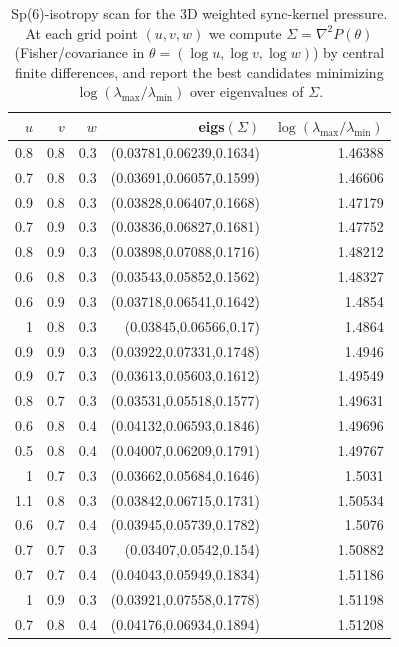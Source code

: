 \begin{table}[H]
\centering
\scriptsize
\setlength{\tabcolsep}{6pt}
\caption{Sp(6)-isotropy scan for the 3D weighted sync-kernel pressure. At each grid point $(u,v,w)$ we compute $\Sigma=\nabla^2P(\theta)$ (Fisher/covariance in $\theta=(\log u,\log v,\log w)$) by central finite differences, and report the best candidates minimizing $\log(\lambda_{\max}/\lambda_{\min})$ over eigenvalues of $\Sigma$.}
\label{tab:sync_kernel_weighted_sp6_isotropy_scan}
\begin{tabular}{r r r r r}
\toprule
$u$ & $v$ & $w$ & eigs$(\Sigma)$ & $\log(\lambda_{\max}/\lambda_{\min})$\\
\midrule
0.8 & 0.8 & 0.3 & (0.03781,0.06239,0.1634) & 1.46388\\
0.7 & 0.8 & 0.3 & (0.03691,0.06057,0.1599) & 1.46606\\
0.9 & 0.8 & 0.3 & (0.03828,0.06407,0.1668) & 1.47179\\
0.7 & 0.9 & 0.3 & (0.03836,0.06827,0.1681) & 1.47752\\
0.8 & 0.9 & 0.3 & (0.03898,0.07088,0.1716) & 1.48212\\
0.6 & 0.8 & 0.3 & (0.03543,0.05852,0.1562) & 1.48327\\
0.6 & 0.9 & 0.3 & (0.03718,0.06541,0.1642) & 1.4854\\
1 & 0.8 & 0.3 & (0.03845,0.06566,0.17) & 1.4864\\
0.9 & 0.9 & 0.3 & (0.03922,0.07331,0.1748) & 1.4946\\
0.9 & 0.7 & 0.3 & (0.03613,0.05603,0.1612) & 1.49549\\
0.8 & 0.7 & 0.3 & (0.03531,0.05518,0.1577) & 1.49631\\
0.6 & 0.8 & 0.4 & (0.04132,0.06593,0.1846) & 1.49696\\
0.5 & 0.8 & 0.4 & (0.04007,0.06209,0.1791) & 1.49767\\
1 & 0.7 & 0.3 & (0.03662,0.05684,0.1646) & 1.5031\\
1.1 & 0.8 & 0.3 & (0.03842,0.06715,0.1731) & 1.50534\\
0.6 & 0.7 & 0.4 & (0.03945,0.05739,0.1782) & 1.5076\\
0.7 & 0.7 & 0.3 & (0.03407,0.0542,0.154) & 1.50882\\
0.7 & 0.7 & 0.4 & (0.04043,0.05949,0.1834) & 1.51186\\
1 & 0.9 & 0.3 & (0.03921,0.07558,0.1778) & 1.51198\\
0.7 & 0.8 & 0.4 & (0.04176,0.06934,0.1894) & 1.51208\\
\bottomrule
\end{tabular}
\end{table}
